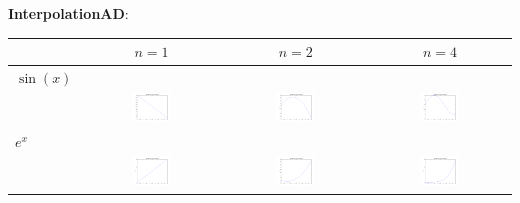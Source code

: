 \documentclass[11pt,a4paper,ngerman]{article}
\begin{document}
\textbf{InterpolationAD}:\\
\begin{tabular}{l|ccc}
 & $n = 1$ & $n = 2$ & $n = 4$ \\
\hline
$\sin(x)$ & & & \\
& \includegraphics[width=0.3\textwidth]{plot1_1.png} & \includegraphics[width=0.3\textwidth]{plot1_2.png} & \includegraphics[width=0.3\textwidth]{plot1_4.png} \\
$e^x$ & & & \\
 & \includegraphics[width=0.3\textwidth]{plot2_1.png} & \includegraphics[width=0.3\textwidth]{plot2_2.png} & \includegraphics[width=0.3\textwidth]{plot2_4.png} \\
\end{tabular}
\end{document}
